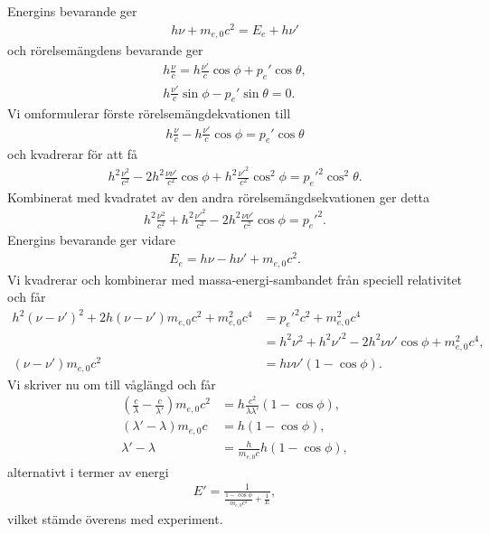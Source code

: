 Energins bevarande ger
\begin{align*}
	h\nu + m_{e, 0}c^{2} = E_{e} + h\nu'
\end{align*}
och rörelsemängdens bevarande ger
\begin{align*}
	h\frac{\nu}{c} = h\frac{\nu'}{c}\cos{\phi} + p_{e}'\cos{\theta}, \\
	h\frac{\nu'}{c}\sin{\phi} - p_{e}'\sin{\theta} = 0.
\end{align*}
Vi omformulerar förste rörelsemängdekvationen till
\begin{align*}
	h\frac{\nu}{c} - h\frac{\nu'}{c}\cos{\phi} = p_{e}'\cos{\theta}
\end{align*}
och kvadrerar för att få
\begin{align*}
	h^{2}\frac{\nu^{2}}{c^{2}} - 2h^{2}\frac{\nu\nu'}{c^{2}}\cos{\phi} + h^{2}\frac{\nu'^{2}}{c^{2}}\cos^{2}{\phi} = p_{e}'^{2}\cos^{2}{\theta}.
\end{align*}
Kombinerat med kvadratet av den andra rörelsemängdsekvationen ger detta
\begin{align*}
	h^{2}\frac{\nu^{2}}{c^{2}} + h^{2}\frac{\nu'^{2}}{c^{2}} - 2h^{2}\frac{\nu\nu'}{c^{2}}\cos{\phi} = p_{e}'^{2}.
\end{align*}
Energins bevarande ger vidare
\begin{align*}
	E_{e} = h\nu - h\nu' + m_{e, 0}c^{2}.
\end{align*}
Vi kvadrerar och kombinerar med massa-energi-sambandet från speciell relativitet och får
\begin{align*}
	h^{2}(\nu - \nu')^{2} + 2h(\nu - \nu')m_{e, 0}c^{2} + m_{e, 0}^{2}c^{4} &= p_{e}'^{2}c^{2} + m_{e, 0}^{2}c^{4} \\
	                                                                        &= h^{2}\nu^{2} + h^{2}\nu'^{2} - 2h^{2}\nu\nu'\cos{\phi} + m_{e, 0}^{2}c^{4}, \\
	(\nu - \nu')m_{e, 0}c^{2}                                               &= h\nu\nu'(1 - \cos{\phi}).
\end{align*}
Vi skriver nu om till våglängd och får
\begin{align*}
	(\frac{c}{\lambda} - \frac{c}{\lambda'})m_{e, 0}c^{2} &= h\frac{c^{2}}{\lambda\lambda'}(1 - \cos{\phi}), \\
	(\lambda' - \lambda)m_{e, 0}c                         &= h(1 - \cos{\phi}), \\
	\lambda' - \lambda                                    &= \frac{h}{m_{e, 0}c}h(1 - \cos{\phi}),
\end{align*}
alternativt i termer av energi
\begin{align*}
	E' = \frac{1}{\frac{1 - \cos{\phi}}{m_{e, 0}c^{2}} + \frac{1}{E}},
\end{align*}
vilket stämde överens med experiment.
